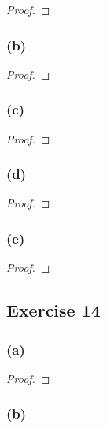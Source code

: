 \documentclass[14pt]{extarticle}
\begin{document}
\begin{proof}

\end{proof}

\subsubsection{(b)}

\begin{proof}

\end{proof}

\subsubsection{(c)}

\begin{proof}

\end{proof}

\subsubsection{(d)}

\begin{proof}

\end{proof}

\subsubsection{(e)}

\begin{proof}

\end{proof}

\subsection{Exercise 14}

\subsubsection{(a)}

\begin{proof}

\end{proof}

\subsubsection{(b)}
\end{document}
